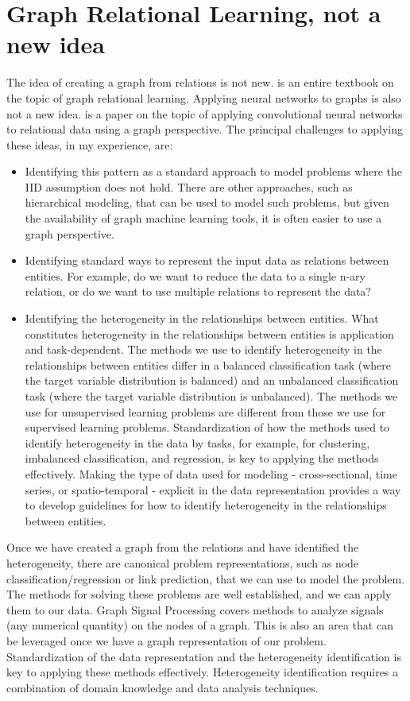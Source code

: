 \documentclass{article}
\begin{document}
\section{Graph Relational Learning, not a new idea}
The idea of creating a graph from relations is not new. \cite{getoor2007introduction} is an entire textbook on the topic of graph relational learning. Applying neural networks to graphs is also not a new idea. \cite{schlichtkrull2018modeling} is a paper on the topic of applying convolutional neural networks to relational data using a graph perspective. The principal challenges to applying these ideas, in my experience, are:
\begin{itemize}
\item Identifying this pattern as a standard approach to model problems where the IID assumption does not hold. There are other approaches, such as hierarchical modeling, that can be used to model such problems, but given the availability of graph machine learning tools, it is often easier to use a graph perspective.
\item Identifying standard ways to represent the input data as relations between entities. For example, do we want to reduce the data to a single n-ary relation, or do we want to use multiple relations to represent the data?
\item Identifying the heterogeneity in the relationships between entities. What constitutes heterogeneity in the relationships between entities is application and task-dependent. The methods we use to identify heterogeneity in the relationships between entities differ in a balanced classification task (where the target variable distribution is balanced) and an unbalanced classification task (where the target variable distribution is unbalanced). The methods we use for unsupervised learning problems are different from those we use for supervised learning problems. Standardization of how the methods used to identify heterogeneity in the data by tasks, for example, for clustering, imbalanced classification, and regression, is key to applying the methods effectively. Making the type of data used for modeling - cross-sectional, time series, or spatio-temporal - explicit in the data representation provides a way to develop guidelines for how to identify heterogeneity in the relationships between entities.
\end{itemize}
Once we have created a graph from the relations and have identified the heterogeneity, there are canonical problem representations, such as node classification/regression or link prediction, that we can use to model the problem. The methods for solving these problems are well established, and we can apply them to our data. Graph Signal Processing covers methods to analyze signals (any numerical quantity) on the nodes of a graph. This is also an area that can be leveraged once we have a graph representation of our problem. Standardization of the data representation and the heterogeneity identification is key to applying these methods effectively. Heterogeneity identification requires a combination of domain knowledge and data analysis techniques.
\end{document}
